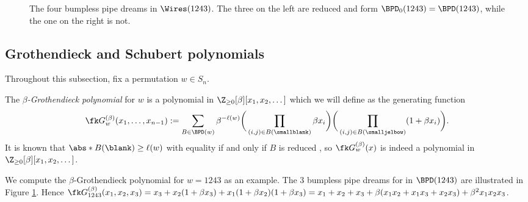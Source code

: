 \begin{figure}


    
    \caption{The four bumpless pipe dreams in $\Wires(1243)$.
    The three on the left are reduced and form $\BPD_0(1243) = \BPD(1243)$, while the one on the right is not.}
    \label{fig:red_bpd}
\end{figure}



\subsection{Grothendieck and Schubert polynomials}
\label{sect:polys}

Throughout this subsection, fix a permutation $w\in S_n$.

The \textit{$\beta$-Grothendieck polynomial} for $w$ is a polynomial in $\Z_{\geq0}[\beta][x_1,x_2,\dots]$ which we will define as the generating function \begin{equation}
\label{eq:groth}
    \fk G^{(\beta)}_w(x_1,\dots,x_{n-1}) :=
    \sum_{B\in \BPD(w)}
    \beta^{-\ell(w)}
    \bigg(
        \prod_{(i,j)\in B(\smallblank)} \beta x_i
    \bigg)
    \bigg(
        \prod_{(i,j)\in B(\smalljelbow)} (1+\beta x_i)
    \bigg).
\end{equation}
It is known that $\abs*{B(\blank)} \geq \ell(w)$ with equality if and only if $B$ is reduced \cite{Wei21},
so $\fk G^{(\beta)}_w(x)$ is indeed a polynomial in $\Z_{\geq 0}[\beta][x_1,x_2,\dots]$.

We compute the $\beta$-Grothendieck polynomial for $w = 1243$ as an example.
The 3 bumpless pipe dreams for in $\BPD(1243)$ are illustrated in Figure \ref{fig:red_bpd}.
Hence $\fk G_{1243}^{(\beta)}(x_1,x_2,x_3) = x_3 + x_2(1+\beta x_3) + x_1(1+\beta x_2)(1+\beta x_3) = x_1+x_2+x_3 + \beta(x_1x_2 + x_1x_3 + x_2x_3) + \beta^2x_1x_2x_3$.

